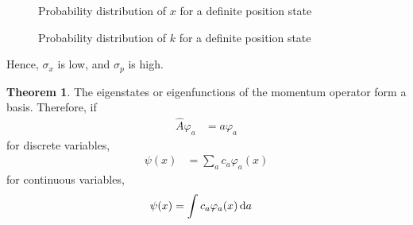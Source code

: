\documentclass[titlepage, fleqn, a4paper, 12pt, twoside]{article}
\theoremstyle{definition}
\theoremstyle{theorem}
\newtheorem{theorem}{Theorem}
\renewcommand{\tilde}{\widetilde}
\begin{document}
\begin{figure}[h]
	\centering
	\caption{Probability distribution of $x$ for a definite position state}
	\label{fig:Probability_distribution_of_$x$_for_a_definite_position_state}
\end{figure}

\begin{figure}[h]
	\centering
	\caption{Probability distribution of $k$ for a definite position state}
	\label{fig:Probability_distribution_of_$k$_for_a_definite_position_state}
\end{figure}

Hence, $\sigma_x$ is low, and $\sigma_p$ is high.

\begin{theorem}
	The eigenstates or eigenfunctions of the momentum operator form a basis.
	Therefore, if
	\begin{align*}
		\hat{A} \varphi_a &= a \varphi_a
	\end{align*}
	for discrete variables,
	\begin{align*}
		\psi(x) &= \sum\limits_{a} c_a \varphi_a(x)
	\end{align*}
	for continuous variables,
	\begin{align*}
		\psi(x) &= \int c_a \varphi_a(x) \dif a
	\end{align*}
\end{theorem}
\end{document}
